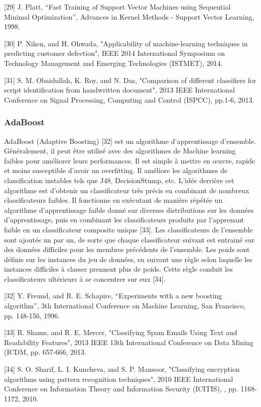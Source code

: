 [29] J. Platt, “Fast Training of Support Vector Machines using Sequential Minimal Optimization”, Advances in Kernel Methods - Support Vector Learning, 1998.

[30] P. Niken, and H. Ohwada, "Applicability of machine-learning techniques in predicting customer defection", IEEE 2014 International Symposium on Technology Management and Emerging Technologies (ISTMET), 2014.

[31] S. M. Obaidullah, K. Roy, and N. Das, "Comparison of different classifiers for script identification from handwritten document", 2013 IEEE International Conference on Signal Processing, Computing and Control (ISPCC), pp.1-6, 2013.

\subsubsection{AdaBoost}
AdaBoost (Adaptive Boosting) [32] est un algorithme d'apprentissage d'ensemble. Généralement, il peut être utilisé avec des algorithmes de Machine learning faibles pour améliorer leurs performances. Il est simple à mettre en œuvre, rapide et moins susceptible d'avoir un overfitting. Il améliore les algorithmes de classification instables tels que J48, DecisionStump, etc. L'idée derrière cet algorithme est d'obtenir un classificateur très précis en combinant de nombreux classificateurs faibles. Il fonctionne en exécutant de manière répétée un algorithme d'apprentissage faible donné sur diverses distributions sur les données d'apprentissage, puis en combinant les classificateurs produits par l'apprenant faible en un classificateur composite unique [33]. Les classificateurs de l'ensemble sont ajoutés un par un, de sorte que chaque classificateur suivant est entrainé sur des données difficiles pour les membres précédents de l'ensemble. Les poids sont définis sur les instances du jeu de données, en suivant une règle selon laquelle les instances difficiles à classer prennent plus de poids. Cette règle conduit les classificateurs ultérieurs à se concentrer sur eux [34].

[32] Y. Freund, and R. E. Schapire, “Experiments with a new boosting algorithm”, 3th International Conference on Machine Learning, San Francisco, pp. 148-156, 1996.

[33] R. Shams, and R. E. Mercer, "Classifying Spam Emails Using Text and Readability Features", 2013 IEEE 13th International Conference on Data Mining (ICDM, pp. 657-666, 2013.

[34] S. O. Sharif, L. I. Kuncheva, and S. P. Mansoor, "Classifying encryption algorithms using pattern recognition techniques", 2010 IEEE International Conference on Information Theory and Information Security (ICITIS), , pp. 1168-1172, 2010.

